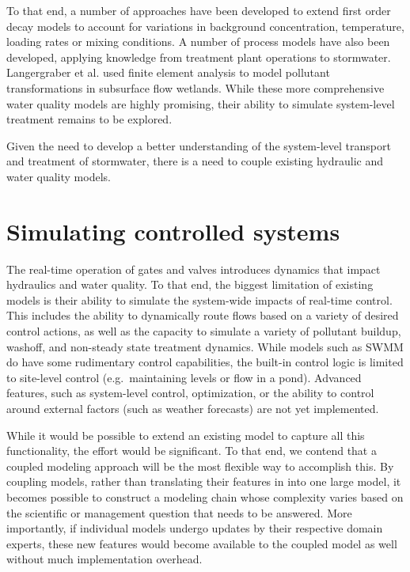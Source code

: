 To that end, a number of approaches have been developed to extend first order decay models to account for variations in background concentration\cite{Shepherd2001Time-DependentConstr}, temperature\cite{Kadlec2008TreatmentWetlands}, loading rates\cite{Mitchell2001AlternativeKinetics} or mixing conditions\cite{Persson2003HowPonds,Wong2006ModellingApproach}. A number of process models have also been developed, applying knowledge from treatment plant operations to stormwater\cite{Langergraber2008ModelingReview}. Langergraber et al.\cite{Langergraber2009CWM1:Wetlands,NterLangergraber2005ModelingWetlands} used finite element analysis to model pollutant transformations in  subsurface flow wetlands. While these more comprehensive water quality models are highly promising, their ability to simulate system-level treatment remains to be explored.

Given the need to develop a better understanding of the system-level transport and treatment of stormwater, there is a need to couple existing hydraulic and water quality models. 



\section{Simulating controlled systems}
The real-time operation of gates and valves introduces dynamics that impact hydraulics and water quality.
To that end, the biggest limitation of existing models is their ability to simulate the system-wide impacts of real-time control.
This includes the ability to dynamically route flows based on a variety of desired control actions, as well as the capacity to simulate a variety of pollutant buildup, washoff, and non-steady state treatment dynamics. 
While models such as SWMM do have some rudimentary control capabilities, the built-in control logic is limited to site-level control (e.g.\ maintaining levels or flow in a pond)\cite{Rossman2010Storm5.1}.
Advanced features, such as system-level control, optimization, or the ability to control around external factors (such as weather forecasts) are not yet implemented\cite{Ria2016MatSWMMSystems}. 

While it would be possible to extend an existing model to capture all this functionality, the effort would be significant. To that end, we contend that a coupled modeling approach\cite{Goodall2011ModelingParadigm}  will be the most flexible way to accomplish this. By coupling models, rather than translating their features in  into one large model, it becomes possible to construct a modeling chain whose complexity varies based on the scientific or management question that needs to be answered. More importantly, if individual models undergo updates by their respective domain experts, these new features would become available to the coupled model as well without much implementation overhead. 


